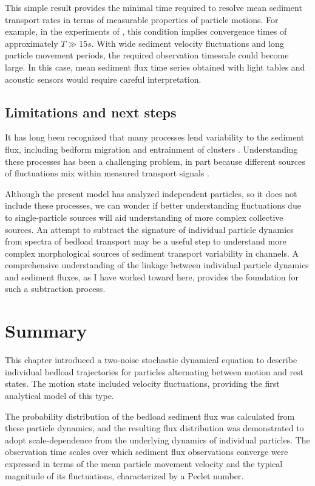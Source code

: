This simple result provides the minimal time required to resolve mean sediment transport rates in terms of measurable properties of particle motions. For example, in the experiments of \citet{Martin2012}, this condition implies convergence times of approximately $T \gg 15 s$. With wide sediment velocity fluctuations and long particle movement periods, the required observation timescale could become large.
In this case, mean sediment flux time series obtained with light tables and acoustic sensors \citep{Zimmermann2008,Tsakiris2014,Mendes2016} would require careful interpretation.

\subsection{Limitations and next steps}

It has long been recognized that many processes lend variability to the sediment flux, including bedform migration \citep{Hamamori1962,Guala2014} and entrainment of clusters \citep{Strom2004,Papanicolaou2018}.
Understanding these processes has been a challenging problem, in part because different sources of fluctuations mix within measured transport signals \citep[e.g.][]{Hoey1992,Singh2009,Saletti2015,Dhont2018}.

Although the present model has analyzed independent particles, so it does not include these processes, we can wonder if better understanding fluctuations due to single-particle sources will aid understanding of more complex collective sources.
An attempt to subtract the signature of individual particle dynamics from spectra of bedload transport may be a useful step to understand more complex morphological sources of sediment transport variability in channels.
A comprehensive understanding of the linkage between individual particle dynamics and sediment fluxes, as I have worked toward here, provides the foundation for such a subtraction process.

\section{Summary \label{sec:conc}} 
This chapter introduced a two-noise stochastic dynamical equation to describe individual bedload trajectories for particles alternating between motion and rest states. The motion state included velocity fluctuations, providing the first analytical model of this type.
 
The probability distribution of the bedload sediment flux was calculated from these particle dynamics, and the resulting flux distribution was demonstrated to adopt scale-dependence from the underlying dynamics of individual particles.
The observation time scales over which sediment flux observations converge were expressed in terms of the mean particle movement velocity and the typical magnitude of its fluctuations, characterized by a Peclet number.
 
